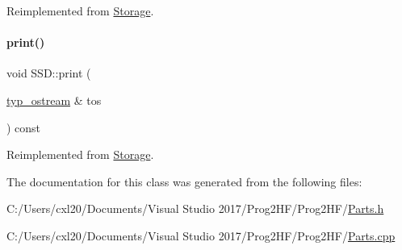 Reimplemented from \mbox{\hyperlink{class_storage_a53fc5b4814df41517b9f2be8dcef605e}{Storage}}.

\mbox{\label{class_s_s_d_a6e252152f8ba75043edec67e19d686e0}} 
\paragraph{\texorpdfstring{print()}{print()}\hspace{0.1cm}{\footnotesize\ttfamily [4/4]}}
{\footnotesize\ttfamily void S\+S\+D\+::print (\begin{DoxyParamCaption}\item[{\mbox{\hyperlink{structtyp__ostream}{typ\+\_\+ostream}} \&}]{tos }\end{DoxyParamCaption}) const\hspace{0.3cm}{\ttfamily [virtual]}}



Reimplemented from \mbox{\hyperlink{class_storage_ad6c13f251a39612a7628980bf2f12918}{Storage}}.



The documentation for this class was generated from the following files\+:\begin{DoxyCompactItemize}
\item 
C\+:/\+Users/cxl20/\+Documents/\+Visual Studio 2017/\+Prog2\+H\+F/\+Prog2\+H\+F/\mbox{\hyperlink{_parts_8h}{Parts.\+h}}\item 
C\+:/\+Users/cxl20/\+Documents/\+Visual Studio 2017/\+Prog2\+H\+F/\+Prog2\+H\+F/\mbox{\hyperlink{_parts_8cpp}{Parts.\+cpp}}\end{DoxyCompactItemize}
